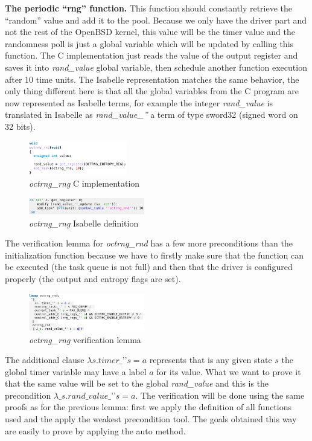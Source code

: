 \documentclass[conference]{IEEEtran}
\begin{document}
\textbf{The periodic “rng” function.}
This function should constantly retrieve the “random” value and add it to the pool. Because we only have the driver part and not the rest of the OpenBSD kernel, this value will be the timer value and the randomness poll is just a global variable which will be updated by calling this function. The C implementation just reads the value of the output register and saves it into \textit{rand\_value} global variable, then schedule another function execution after 10 time units. The Isabelle representation matches the same behavior, the only thing different here is that all the global variables from the C program are now represented as Isabelle terms, for example the integer \textit{rand\_value} is translated in Isabelle as \textit{rand\_value\_''} a term of type sword32 (signed word on 32 bits).
\begin{figure}[htbp]
\centerline{\includegraphics[width=0.38\textwidth]{rnd_c.png}}
\caption{\textit{octrng\_rng} C implementation} 
\label{fig}
\end{figure}
\begin{figure}[htbp]
\centerline{\includegraphics[width=0.45\textwidth]{rnd_thy.png}}
\caption{\textit{octrng\_rng} Isabelle definition} 
\label{fig}
\end{figure}
The verification lemma for \textit{octrng\_rnd} has a few more preconditions than the initialization function because we have to firstly make sure that the function can be executed (the task queue is not full) and then that the driver is configured properly (the output and entropy flags are set). 
\begin{figure}[htbp]
\centerline{\includegraphics[width=0.45\textwidth]{rnd_lemma.png}}
\caption{\textit{octrng\_rng} verification lemma} 
\label{fig}
\end{figure}
The additional clause $ \lambda s. timer\_’’ s = a$ represents that is any given state $s$ the global timer variable may have a label $a$ for its value. What we want to prove it that the same value will be set to the global \textit{rand\_value} and this is the precondition $ \lambda\_ s. rand\_value\_’’ s = a$. The verification will be done using the same proofs as for the previous lemma: first we apply the definition of all functions used and the apply the weakest precondition tool. The goals obtained this way are easily to prove by applying the auto method.\\
\end{document}
